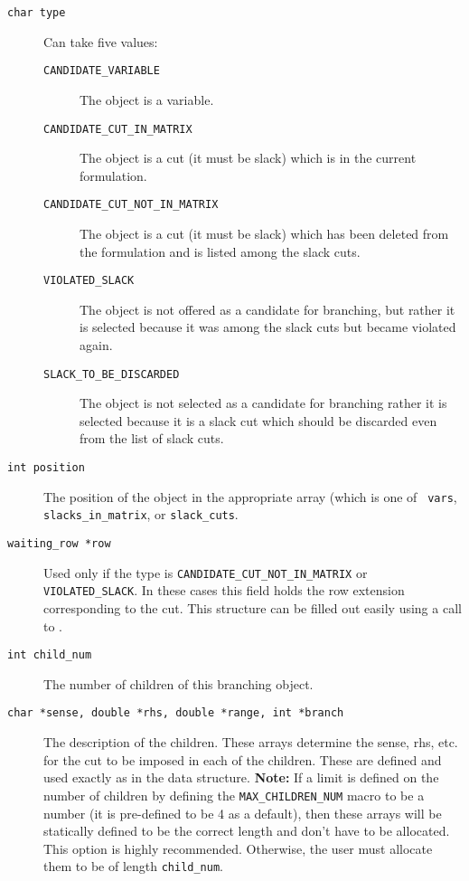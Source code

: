 \begin{description}

\item[\tt char type] Can take five values:
\begin{description}
\item[\tt CANDIDATE\_VARIABLE] The object is a variable.
\item[\tt CANDIDATE\_CUT\_IN\_MATRIX] The object is a cut (it must
be slack) which is in the current formulation.
\item[\tt CANDIDATE\_CUT\_NOT\_IN\_MATRIX] The object is a cut (it
must be slack) which has been deleted from the formulation and is listed among
the slack cuts.
\item[\tt VIOLATED\_SLACK] The object is not offered as a candidate for
branching, but rather it is selected because it was among the slack cuts but
became violated again.
\item[\tt SLACK\_TO\_BE\_DISCARDED] The object is not selected as a candidate
for branching rather it is selected because it is a slack cut which should be
discarded even from the list of slack cuts.
\end{description}

\item[\tt int position]

The position of the object in the appropriate array (which is one of {\tt
vars}, {\tt slacks\_in\_matrix}, or {\tt slack\_cuts}.

\item[\tt waiting\_row *row] 

Used only if the type is {\tt CANDIDATE\_CUT\_NOT\_IN\_MATRIX} or {\tt
VIOLATED\_SLACK}. In these cases this field holds the row extension
corresponding to the cut. This structure can be filled out easily
using a call to {\tt {}}.

\item[\tt int child\_num] \hfill

The number of children of this branching object.

\item[\tt char *sense, double *rhs, double *range, int *branch] \hfill

The description of the children. These arrays determine the sense,
rhs, etc. for the cut to be imposed in each of the children. These are
defined and used exactly as in the {\tt {}}
data structure. {\bf Note:} If a limit is defined on the number of
children by defining the {\tt MAX\_CHILDREN\_NUM} macro to be a number
(it is pre-defined to be 4 as a default), then these arrays will be
statically defined to be the correct length and don't have to be
allocated. This option is highly recommended. Otherwise, the user must
allocate them to be of length {\tt child\_num}.


\end{description}
